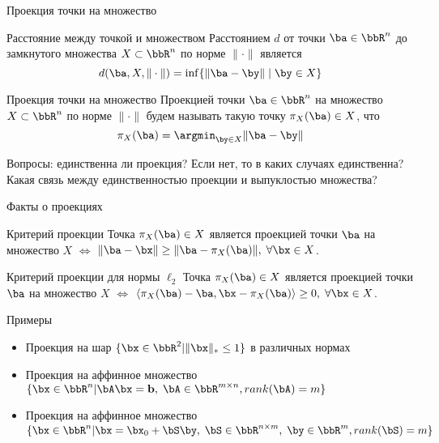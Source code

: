 \documentclass[12pt]{beamer}
\begin{document}
\begin{frame}{Проекция точки на множество}
\small
\begin{block}{Расстояние между точкой и множеством}
Расстоянием $d$ от точки $\ba \in \bbR^n$ до замкнутого множества $X \subset \bbR^n$ по норме $\| \cdot \|$ является
\vspace{-4mm}
\[
d(\ba, X, \| \cdot \|) = \inf\{\| \ba - \by \| \; | \; \by \in X\}
\]
\end{block}
\begin{block}{Проекция точки на множество}
Проекцией точки $\ba \in \bbR^n$ на множество $X \subset \bbR^n$ по норме $\| \cdot \|$ будем называть такую точку $\pi_X(\ba) \in X$, что
\vspace{-4mm}
\[
\pi_X(\ba) = \argmin_{\by \in X} \| \ba - \by \|
\]
\end{block}
Вопросы: единственна ли проекция? Если нет, то в каких случаях единственна? Какая связь между единственностью проекции и выпуклостью множества?

\end{frame}

\begin{frame}{Факты о проекциях}

\begin{block}{Критерий проекции}
Точка $\pi_X(\ba) \in X$ является проекцией точки $\ba$ на множество $X$ $\Leftrightarrow$ $\| \ba - \bx \| \geq \| \ba - \pi_X(\ba) \|, \; \forall \bx \in X$.
\end{block}

\begin{block}{Критерий проекции для нормы $\ell_2$}
Точка $\pi_X(\ba) \in X$ является проекцией точки $\ba$ на множество $X$ $\Leftrightarrow$ $\langle \pi_X(\ba) - \ba, \bx - \pi_X(\ba) \rangle \geq 0, \; \forall \bx \in X$.
\end{block}
\end{frame}

\begin{frame}{Примеры}
\begin{itemize}
\item Проекция на шар $\{\bx \in \bbR^2 | \| \bx \|_* \leq 1\}$ в различных нормах
\item Проекция на аффинное множество $\{ \bx \in \bbR^n | \bA\bx = \mathbf{b}, \; \bA \in \bbR^{m \times n}, rank(\bA) = m \}$
\item Проекция на аффинное множество $\{ \bx \in \bbR^n | \bx = \bx_0 + \bS\by, \; \bS \in \bbR^{n \times m}, \; \by \in \bbR^m, rank(\bS) = m \}$
\end{itemize}
\end{frame}
\end{document}
